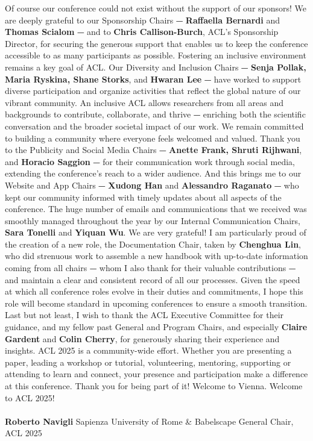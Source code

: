 Of course our conference could not exist without the support of our sponsors! We are deeply grateful to our Sponsorship Chairs ⏤ \textbf{Raffaella Bernardi} and \textbf{Thomas Scialom} ⏤ and to \textbf{Chris Callison-Burch}, ACL’s Sponsorship Director, for securing the generous support that enables us to keep the conference accessible to as many participants as possible.
Fostering an inclusive environment remains a key goal of ACL. Our Diversity and Inclusion Chairs ⏤ \textbf{Senja Pollak, Maria Ryskina, Shane Storks}, and \textbf{Hwaran Lee} ⏤ have worked to support diverse participation and organize activities that reflect the global nature of our vibrant community. An inclusive ACL allows researchers from all areas and backgrounds to contribute, collaborate, and thrive ⏤ enriching both the scientific conversation and the broader societal impact of our work. We remain committed to building a community where everyone feels welcomed and valued.
Thank you to the Publicity and Social Media Chairs ⏤ \textbf{Anette Frank, Shruti Rijhwani}, and \textbf{Horacio Saggion} ⏤ for their communication work through social media, extending the conference’s reach to a wider audience. And this brings me to our Website and App Chairs ⏤ \textbf{Xudong Han} and \textbf{Alessandro Raganato} ⏤ who kept our community informed with timely updates about all aspects of the conference. The huge number of emails and communications that we received was smoothly managed throughout the year by our Internal Communication Chairs, \textbf{Sara Tonelli} and \textbf{Yiquan Wu}. We are very grateful!
I am particularly proud of the creation of a new role, the Documentation Chair, taken by \textbf{Chenghua Lin}, who did strenuous work to assemble a new handbook with up-to-date information coming from all chairs ⏤ whom I also thank for their valuable contributions ⏤ and maintain a clear and consistent record of all our processes. Given the speed at which all conference roles evolve in their duties and commitments, I hope this role will become standard in upcoming conferences to ensure a smooth transition.
Last but not least, I wish to thank the ACL Executive Committee for their guidance, and my fellow past General and Program Chairs, and especially \textbf{Claire Gardent} and \textbf{Colin Cherry}, for generously sharing their experience and insights.
ACL 2025 is a community-wide effort. Whether you are presenting a paper, leading a workshop or tutorial, volunteering, mentoring, supporting or attending to learn and connect, your presence and participation make a difference at this conference. Thank you for being part of it!
Welcome to Vienna. Welcome to ACL 2025!\\
\\
\textbf{Roberto Navigli}
Sapienza University of Rome & Babelscape
General Chair, ACL 2025

